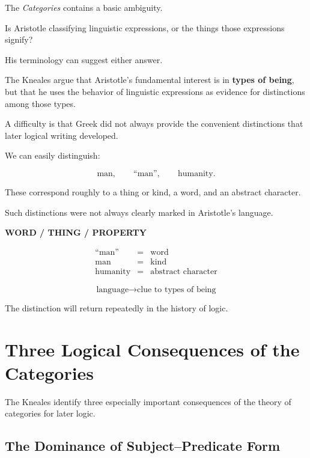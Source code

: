 \documentclass[11pt]{article}
\newcommand{\boardtakeaway}[1]{
    \begin{center}
    \fbox{
        \parbox{0.88\linewidth}{
            \centering
            \textbf{#1}
        }
    }
    \end{center}
}
\begin{document}
The \textit{Categories} contains a basic ambiguity.

Is Aristotle classifying linguistic expressions, or the things
those expressions signify?

His terminology can suggest either answer.

The Kneales argue that Aristotle's fundamental interest is in
\textbf{types of being}, but that he uses the behavior of
linguistic expressions as evidence for distinctions among those
types.

A difficulty is that Greek did not always provide the convenient
distinctions that later logical writing developed.

We can easily distinguish:

\[
\text{man},
\qquad
\text{``man''},
\qquad
\text{humanity}.
\]

These correspond roughly to a thing or kind, a word, and an
abstract character.

Such distinctions were not always clearly marked in Aristotle's
language.

\begin{whiteboard}
\textbf{WORD / THING / PROPERTY}

\[
\begin{array}{rcl}
\text{``man''} & = & \text{word}\\
\text{man} & = & \text{kind}\\
\text{humanity} & = & \text{abstract character}
\end{array}
\]

\vspace{0.4em}

\[
\text{language}
\longrightarrow
\text{clue to types of being}
\]

\boardtakeaway{word $\neq$ thing $\neq$ property}
\end{whiteboard}

The distinction will return repeatedly in the history of logic.

\section{Three Logical Consequences of the Categories}

The Kneales identify three especially important consequences of
the theory of categories for later logic.

\subsection{The Dominance of Subject--Predicate Form}
\end{document}
